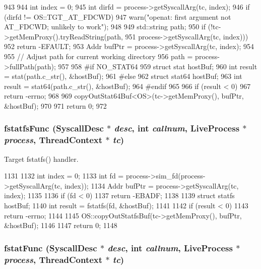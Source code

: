 \begin{DoxyCode}
943 {
944     int index = 0;
945     int dirfd = process->getSyscallArg(tc, index);
946     if (dirfd != OS::TGT_AT_FDCWD)
947         warn("openat: first argument not AT_FDCWD; unlikely to work");
948 
949     std::string path;
950     if (!tc->getMemProxy().tryReadString(path,
951                 process->getSyscallArg(tc, index)))
952         return -EFAULT;
953     Addr bufPtr = process->getSyscallArg(tc, index);
954 
955     // Adjust path for current working directory
956     path = process->fullPath(path);
957 
958 #if NO_STAT64
959     struct stat  hostBuf;
960     int result = stat(path.c_str(), &hostBuf);
961 #else
962     struct stat64 hostBuf;
963     int result = stat64(path.c_str(), &hostBuf);
964 #endif
965 
966     if (result < 0)
967         return -errno;
968 
969     copyOutStat64Buf<OS>(tc->getMemProxy(), bufPtr, &hostBuf);
970 
971     return 0;
972 }
\end{DoxyCode}
\hypertarget{syscall__emul_8hh_a4cc46834712d2de5f76e696ab5d7a275}{
\subsubsection[{fstatfsFunc}]{ fstatfsFunc ({\bf SyscallDesc} $\ast$ {\em desc}, \/  int {\em callnum}, \/  {\bf LiveProcess} $\ast$ {\em process}, \/  {\bf ThreadContext} $\ast$ {\em tc})}}
\label{syscall__emul_8hh_a4cc46834712d2de5f76e696ab5d7a275}


Target fstatfs() handler. 


\begin{DoxyCode}
1131 {
1132     int index = 0;
1133     int fd = process->sim_fd(process->getSyscallArg(tc, index));
1134     Addr bufPtr = process->getSyscallArg(tc, index);
1135 
1136     if (fd < 0)
1137         return -EBADF;
1138 
1139     struct statfs hostBuf;
1140     int result = fstatfs(fd, &hostBuf);
1141 
1142     if (result < 0)
1143         return -errno;
1144 
1145     OS::copyOutStatfsBuf(tc->getMemProxy(), bufPtr, &hostBuf);
1146 
1147     return 0;
1148 }
\end{DoxyCode}
\hypertarget{syscall__emul_8hh_a56cd0d550ccc314d5ad3f735436c9d92}{
\subsubsection[{fstatFunc}]{ fstatFunc ({\bf SyscallDesc} $\ast$ {\em desc}, \/  int {\em callnum}, \/  {\bf LiveProcess} $\ast$ {\em process}, \/  {\bf ThreadContext} $\ast$ {\em tc})}}
\label{syscall__emul_8hh_a56cd0d550ccc314d5ad3f735436c9d92}


